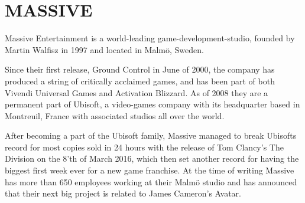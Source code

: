
%
%
%


%
%


\section[MASSIVE Entertainment | A Ubisoft studio]{MASSIVE}

{}

  Massive Entertainment is a world-leading game-development-studio, founded by
  Martin Walfisz in 1997 and located in Malmö, Sweden.

  Since their first release, Ground Control in June of 2000,
  the company has produced a string of critically acclaimed games,
  and has been part of both Vivendi Universal Games and Activation Blizzard. As
  of 2008 they are a permanent part of Ubisoft, a video-games company
  with its headquarter based in Montreuil, France with associated studios all
  over the world.

  After becoming a part of the Ubisoft family, Massive managed to break
  Ubisofts record for most copies sold in 24 hours with the release of Tom
  Clancy's The Division on the 8'th of March 2016, which then set another
  record for having the biggest first week ever for a new game franchise.
  At the time of writing Massive has more than 650 employees working at their
  Malmö studio and has announced that their next big project is related to
  James Cameron's Avatar.

